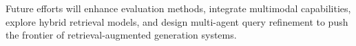 \documentclass{scrartcl}
\begin{document}
Future efforts will enhance evaluation methods, integrate multimodal capabilities, explore hybrid retrieval models, and design multi-agent query refinement to push the frontier of retrieval-augmented generation systems.




\end{document}
